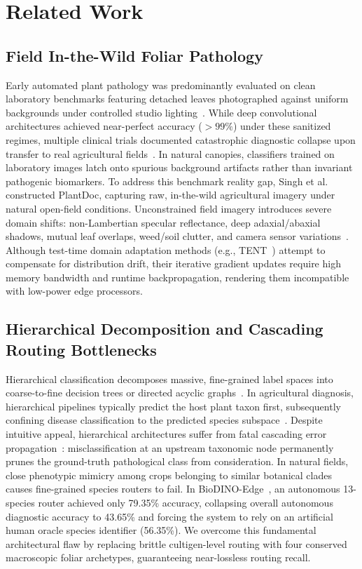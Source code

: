 \section{Related Work}
\label{sec:related_work}

\subsection{Field In-the-Wild Foliar Pathology}
\label{subsec:related_field_pathology}
Early automated plant pathology was predominantly evaluated on clean laboratory benchmarks featuring detached leaves photographed against uniform backgrounds under controlled studio lighting~\cite{mohanty2016using, hughes2015open}. While deep convolutional architectures achieved near-perfect accuracy ($>99\%$) under these sanitized regimes, multiple clinical trials documented catastrophic diagnostic collapse upon transfer to real agricultural fields~\cite{singh2016deep}. In natural canopies, classifiers trained on laboratory images latch onto spurious background artifacts rather than invariant pathogenic biomarkers. To address this benchmark reality gap, Singh et al.~\cite{singh2020plantdoc} constructed PlantDoc, capturing raw, in-the-wild agricultural imagery under natural open-field conditions. Unconstrained field imagery introduces severe domain shifts: non-Lambertian specular reflectance, deep adaxial/abaxial shadows, mutual leaf overlaps, weed/soil clutter, and camera sensor variations~\cite{singh2020plantdoc, argueso2020few}. Although test-time domain adaptation methods (e.g., TENT~\cite{wang2021tent}) attempt to compensate for distribution drift, their iterative gradient updates require high memory bandwidth and runtime backpropagation, rendering them incompatible with low-power edge processors.

\subsection{Hierarchical Decomposition and Cascading Routing Bottlenecks}
\label{subsec:related_hierarchical_routing}
Hierarchical classification decomposes massive, fine-grained label spaces into coarse-to-fine decision trees or directed acyclic graphs~\cite{silla2011survey}. In agricultural diagnosis, hierarchical pipelines typically predict the host plant taxon first, subsequently confining disease classification to the predicted species subspace~\cite{wu2020using, alsaadi2026biodino}. Despite intuitive appeal, hierarchical architectures suffer from fatal cascading error propagation~\cite{silla2011survey}: misclassification at an upstream taxonomic node permanently prunes the ground-truth pathological class from consideration. In natural fields, close phenotypic mimicry among crops belonging to similar botanical clades causes fine-grained species routers to fail. In BioDINO-Edge~\cite{alsaadi2026biodino}, an autonomous 13-species router achieved only 79.35\% accuracy, collapsing overall autonomous diagnostic accuracy to 43.65\% and forcing the system to rely on an artificial human oracle species identifier (56.35\%). We overcome this fundamental architectural flaw by replacing brittle cultigen-level routing with four conserved macroscopic foliar archetypes, guaranteeing near-lossless routing recall.

